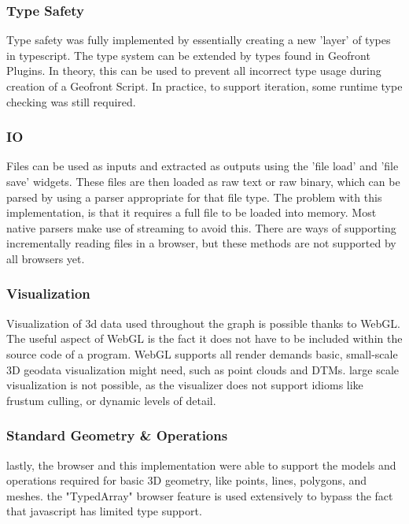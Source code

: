 \subsubsection*{Type Safety}
Type safety was fully implemented by essentially creating a new 'layer' of types in typescript.
The type system can be extended by types found in Geofront Plugins.  
In theory, this can be used to prevent all incorrect type usage during creation of a Geofront Script.
In practice, to support iteration, some runtime type checking was still required. 

\subsubsection*{IO}
Files can be used as inputs and extracted as outputs using the 'file load' and 'file save' widgets. 
These files are then loaded as raw text or raw binary, which can be parsed by using a parser appropriate for that file type. 
The problem with this implementation, is that it requires a full file to be loaded into memory. 
Most native parsers make use of streaming to avoid this. 
There are ways of supporting incrementally reading files in a browser, but these methods are not supported by all browsers yet. 

\subsubsection*{Visualization}
Visualization of 3d data used throughout the graph is possible thanks to WebGL. 
The useful aspect of WebGL is the fact it does not have to be included within the source code of a program. 
WebGL supports all render demands basic, small-scale 3D geodata visualization might need, such as point clouds and DTMs.
large scale visualization is not possible, as the visualizer does not support idioms like frustum culling, or dynamic levels of detail. 

\subsubsection*{Standard Geometry \& Operations}
lastly, the browser and this implementation were able to support the models and operations required for basic 3D geometry, like points, lines, polygons, and meshes.
the "TypedArray" browser feature is used extensively to bypass the fact that javascript has limited type support.


